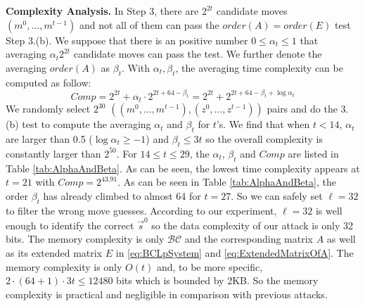 \noindent\textbf{Complexity Analysis. }
In Step 3, there are $2^{2t}$ candidate moves $(m^0,\ldots, m^{t-1})$ and not all of them can pass the $order(A)=order(E)$ test Step 3.(b).
We suppose that there is an positive number $0\leq \alpha_t \leq 1$ that averaging $\alpha_t  2^{2t}$ candidate moves can pass the test.
We further denote the averaging $order(A)$ as $\beta_t $.
With $\alpha_t ,\beta_t $, the averaging time complexity can be computed as follow:
\begin{equation}\label{eq:Complexity}
  Comp=2^{2t}+\alpha_t \cdot 2^{2t+64-\beta_t }=2^{2t}+2^{2t+64-\beta_t +\log\alpha_t }
\end{equation}
We randomly select $2^{30}$ $((m^0,\ldots, m^{t-1}), (z^0,\ldots, z^{t-1}))$ pairs and do the 3.(b) test to compute the averaging $\alpha_t$ and $\beta_t$ for $t$'s.
We find that when $t<14$, $\alpha_t$ are larger than 0.5 ($\log\alpha_t\geq -1$) and $\beta_t\leq 3t$ so the overall complexity is constantly larger than $2^{50}$.
For $14\leq t\leq 29$, the $\alpha_t$, $\beta_t$ and $Comp$ are listed in Table \ref{tab:AlphaAndBeta}.
As can be seen, the lowest time complexity appears at $t=21$ with $Comp=2^{43.91}$.
As can be seen in Table \ref{tab:AlphaAndBeta}, the order $\beta_t$ has already climbed to almost 64 for $t=27$.
So we can safely set $\ell=32$ to filter the wrong move guesses.
According to our experiment, $\ell=32$ is well enough to identify the correct $\vec{s}^0$ so the data complexity of our attack is only 32 bits.
The memory complexity is only $\mathcal{BC}$ and the corresponding matrix $A$ as well as its extended matrix $E$ in \eqref{eq:BCLpSystem} and \eqref{eq:ExtendedMatrixOfA}.
The memory complexity is only $O(t)$ and, to be more specific, $2\cdot (64+1)\cdot 3t\leq 12480$ bits which is bounded by 2KB.
So the memory complexity is practical and negligible in comparison with previous attacks.


